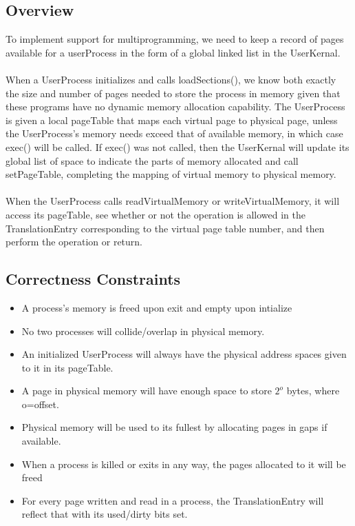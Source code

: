 \documentclass{article}
\begin{document}
\subsection{Overview}
To implement support for multiprogramming, we need to keep a record of pages available for a userProcess in the form of a global linked list in the UserKernal. \\\\
When a UserProcess initializes and calls loadSections(), we know both exactly the size and number of pages needed to store the process in memory given that these programs have no dynamic memory allocation capability. The UserProcess is given a local pageTable that maps each virtual page to physical page, unless the UserProcess's memory needs exceed that of available memory, in which case exec() will be called. If exec() was not called, then the UserKernal will update its global list of space to indicate the parts of memory allocated and call setPageTable, completing the mapping of virtual memory to physical memory.\\\\
When the UserProcess calls readVirtualMemory or writeVirtualMemory, it will access its pageTable, see whether or not the operation is allowed in the TranslationEntry corresponding to the virtual page table  number, and then perform the operation or return.

\subsection{Correctness Constraints}
\begin{itemize}
\item A process's memory is freed upon exit and empty upon intialize
\item No two processes will collide/overlap in physical memory.
\item An initialized UserProcess will always have the physical address spaces given to it in its pageTable.
\item A page in physical memory will have enough space to store $2^{o}$ bytes, where o=offset.
\item Physical memory will be used to its fullest by allocating pages in gaps if available.
\item When a process is killed or exits in any way, the pages allocated to it will be freed
\item For every page written and read in a process, the TranslationEntry will reflect that with its used/dirty bits set.
\end{itemize}
\end{document}
